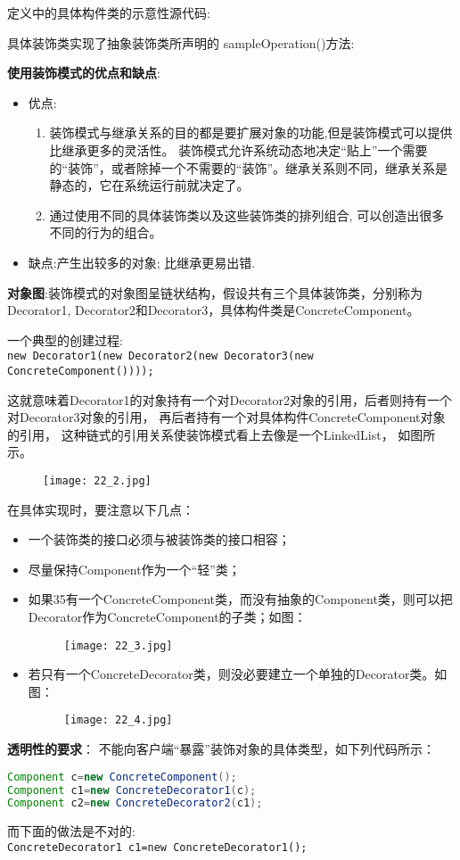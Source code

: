 \documentclass[../main.tex]{subfiles}
\begin{document}
定义中的具体构件类的示意性源代码:
%

%
具体装饰类实现了抽象装饰类所声明的 sampleOperation()方法:

%
\textbf{使用装饰模式的优点和缺点}:
\begin{itemize}
  \item 优点:
    \begin{enumerate}
      \item 装饰模式与继承关系的目的都是要扩展对象的功能,但是装饰模式可以提供比继承更多的灵活性。
        装饰模式允许系统动态地决定``贴上''一个需要的``装饰''，或者除掉一个不需要的``装饰''。继承关系则不同，继承关系是静态的，它在系统运行前就决定了。
      \item 通过使用不同的具体装饰类以及这些装饰类的排列组合,   可以创造出很多不同的行为的组合。
    \end{enumerate}
  \item 缺点:产生出较多的对象; 比继承更易出错.
\end{itemize}
%
\noindent \textbf{对象图}:装饰模式的对象图呈链状结构，假设共有三个具体装饰类，分别称为Decorator1, Decorator2和Decorator3，具体构件类是ConcreteComponent。

\noindent 一个典型的创建过程: \\
\texttt{new Decorator1(new Decorator2(new Decorator3(new ConcreteComponent())));}

这就意味着Decorator1的对象持有一个对Decorator2对象的引用，后者则持有一个对Decorator3对象的引用，
再后者持有一个对具体构件ConcreteComponent对象的引用，
这种链式的引用关系使装饰模式看上去像是一个LinkedList， 如图所示。
\begin{figure}[H]
  \texttt{[image: 22\_2.jpg]}
\end{figure}
%
在具体实现时，要注意以下几点：
\begin{itemize}
  \item 一个装饰类的接口必须与被装饰类的接口相容；
  \item 尽量保持Component作为一个“轻”类；
  \item 如果35有一个ConcreteComponent类，而没有抽象的Component类，则可以把Decorator作为ConcreteComponent的子类；如图：
    \begin{figure}[H]
      \texttt{[image: 22\_3.jpg]}
    \end{figure}
  \item 若只有一个ConcreteDecorator类，则没必要建立一个单独的Decorator类。如图：
    \begin{figure}[H]
      \texttt{[image: 22\_4.jpg]}
    \end{figure}
\end{itemize}
%
\textbf{透明性的要求}：
不能向客户端“暴露”装饰对象的具体类型，如下列代码所示：
%
\begin{lstlisting}[language=java]
Component c=new ConcreteComponent();
Component c1=new ConcreteDecorator1(c);
Component c2=new ConcreteDecorator2(c1);
\end{lstlisting}
%
而下面的做法是不对的: \\
\texttt{ConcreteDecorator1 c1=new ConcreteDecorator1();}
\end{document}
